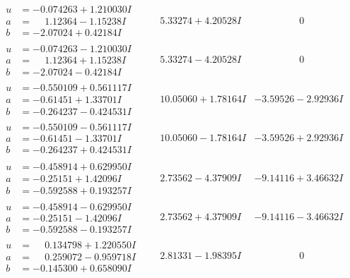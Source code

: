 \documentclass[1p]{elsarticle_modified}
\theoremstyle{definition}
\begin{document}
$$\begin{array}{c|c|c}
\begin{aligned}
u &= -0.074263 + 1.210030 I \\
a &= \phantom{-}1.12364 - 1.15238 I \\
b &= -2.07024 + 0.42184 I\end{aligned}
 & \phantom{-}5.33274 + 4.20528 I & \phantom{-0.000000 } 0 \\ \hline\begin{aligned}
u &= -0.074263 - 1.210030 I \\
a &= \phantom{-}1.12364 + 1.15238 I \\
b &= -2.07024 - 0.42184 I\end{aligned}
 & \phantom{-}5.33274 - 4.20528 I & \phantom{-0.000000 } 0 \\ \hline\begin{aligned}
u &= -0.550109 + 0.561117 I \\
a &= -0.61451 + 1.33701 I \\
b &= -0.264237 - 0.424531 I\end{aligned}
 & \phantom{-}10.05060 + 1.78164 I & -3.59526 - 2.92936 I \\ \hline\begin{aligned}
u &= -0.550109 - 0.561117 I \\
a &= -0.61451 - 1.33701 I \\
b &= -0.264237 + 0.424531 I\end{aligned}
 & \phantom{-}10.05060 - 1.78164 I & -3.59526 + 2.92936 I \\ \hline\begin{aligned}
u &= -0.458914 + 0.629950 I \\
a &= -0.25151 + 1.42096 I \\
b &= -0.592588 + 0.193257 I\end{aligned}
 & \phantom{-}2.73562 - 4.37909 I & -9.14116 + 3.46632 I \\ \hline\begin{aligned}
u &= -0.458914 - 0.629950 I \\
a &= -0.25151 - 1.42096 I \\
b &= -0.592588 - 0.193257 I\end{aligned}
 & \phantom{-}2.73562 + 4.37909 I & -9.14116 - 3.46632 I \\ \hline\begin{aligned}
u &= \phantom{-}0.134798 + 1.220550 I \\
a &= \phantom{-}0.259072 - 0.959718 I \\
b &= -0.145300 + 0.658090 I\end{aligned}
 & \phantom{-}2.81331 - 1.98395 I & \phantom{-0.000000 } 0 \\ \hline\begin{aligned}

\end{aligned}
\end{array}$$
\end{document}
